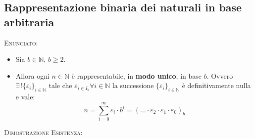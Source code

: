 \documentclass[10pt]{article}
\begin{document}
\subsection{Rappresentazione binaria dei naturali in base arbitraria}
\textsc{Enunciato:}
\begin{itemize}
\item
Sia $b \in \mathbb{N}$, $b \geq 2$. 
\item
Allora ogni $n\in \mathbb{N}$ è rappresentabile, in \textbf{modo unico}, in base $b$. Ovvero $\exists \,! \{\varepsilon_i\}_{i \in \mathbb{N}}$ tale che $\varepsilon_{i \in I_b} \forall i \in \mathbb{N}$ la successione $\{\varepsilon_i\}_{i \in \mathbb{N}}$ è definitivamente nulla e vale:
$$ n = \displaystyle{\sum_{i=0}^{\infty} \varepsilon_i \cdot b^i = (\dots \cdot \varepsilon_2 \cdot \varepsilon_1 \cdot \varepsilon_0)_b}$$
\end{itemize}
\textsc{Dimostrazione Esistenza:}
\end{document}
